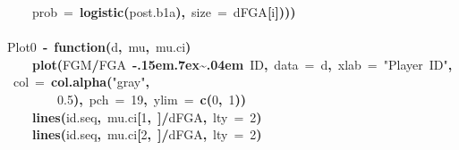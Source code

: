 \documentclass{article}
\makeatletter
\newcommand{\hlnumber}[1]{\textcolor[rgb]{0,0,0}{#1}}%
\newcommand{\hlfunctioncall}[1]{\textcolor[rgb]{.5,0,.33}{\textbf{#1}}}%
\newcommand{\hlstring}[1]{\textcolor[rgb]{.6,.6,1}{#1}}%
\newcommand{\hlkeyword}[1]{\textbf{#1}}%
\newcommand{\hlargument}[1]{\textcolor[rgb]{.69,.25,.02}{#1}}%
\newcommand{\hlformalargs}[1]{\hlargument{#1}}%
\newcommand{\hlassignement}[1]{\textbf{#1}}%
\newcommand{\hlsymbol}[1]{#1}%
\def\urltilda{\kern -.15em\lower .7ex\hbox{\~{}}\kern .04em}%
\newcommand{\hlstd}[1]{\textcolor[rgb]{0,0,0}{#1}}%
\newenvironment{kframe}{%
 \def\FrameCommand##1{\hskip\@totalleftmargin \hskip-\fboxsep
 \colorbox{shadecolor}{##1}\hskip-\fboxsep
     \hskip-\linewidth \hskip-\@totalleftmargin \hskip\columnwidth}%
 \MakeFramed {\advance\hsize-\width
   \@totalleftmargin\z@ \linewidth\hsize
   \@setminipage}}%
 {\par\unskip\endMakeFramed}
\newenvironment{knitrout}{}{} %
\makeatother
\begin{document}
\begin{knitrout}
{\begin{kframe}
\begin{flushleft}
\hlstd{}{\ }{\ }{\ }{\ }\hlargument{prob}{\ }\hlargument{=}{\ }\hlfunctioncall{logistic}\hlkeyword{(}\hlsymbol{post.b1}\hlkeyword{\usebox{\hlnormalsizeboxdollar}}\hlsymbol{a}\hlkeyword{)}\hlkeyword{,}{\ }\hlargument{size}{\ }\hlargument{=}{\ }\hlsymbol{d}\hlkeyword{\usebox{\hlnormalsizeboxdollar}}\hlsymbol{FGA}\hlkeyword{[}\hlsymbol{i}\hlkeyword{]}\hlkeyword{)}\hlkeyword{)}\hlkeyword{)}\hspace*{\fill}\\
\hlstd{}\hspace*{\fill}\\
\hlstd{}\hlsymbol{Plot0}{\ }\hlassignement{\usebox{\hlnormalsizeboxlessthan}-}{\ }\hlkeyword{function}\hlkeyword{(}\hlformalargs{d}\hlkeyword{,}{\ }\hlformalargs{mu}\hlkeyword{,}{\ }\hlformalargs{mu.ci}\hlkeyword{)}{\ }\hlkeyword{\usebox{\hlnormalsizeboxopenbrace}}\hspace*{\fill}\\
\hlstd{}{\ }{\ }{\ }{\ }\hlfunctioncall{plot}\hlkeyword{(}\hlsymbol{FGM}\hlkeyword{/}\hlsymbol{FGA}{\ }\hlkeyword{\urltilda{}}{\ }\hlsymbol{ID}\hlkeyword{,}{\ }\hlargument{data}{\ }\hlargument{=}{\ }\hlsymbol{d}\hlkeyword{,}{\ }\hlargument{xlab}{\ }\hlargument{=}{\ }\hlstring{"Player{\ }ID"}\hlkeyword{,}{\ }\hlargument{col}{\ }\hlargument{=}{\ }\hlfunctioncall{col.alpha}\hlkeyword{(}\hlstring{"gray"}\hlkeyword{,}\hspace*{\fill}\\
\hlstd{}{\ }{\ }{\ }{\ }{\ }{\ }{\ }{\ }\hlnumber{0.5}\hlkeyword{)}\hlkeyword{,}{\ }\hlargument{pch}{\ }\hlargument{=}{\ }\hlnumber{19}\hlkeyword{,}{\ }\hlargument{ylim}{\ }\hlargument{=}{\ }\hlfunctioncall{c}\hlkeyword{(}\hlnumber{0}\hlkeyword{,}{\ }\hlnumber{1}\hlkeyword{)}\hlkeyword{)}\hspace*{\fill}\\
\hlstd{}{\ }{\ }{\ }{\ }\hlfunctioncall{lines}\hlkeyword{(}\hlsymbol{id.seq}\hlkeyword{,}{\ }\hlsymbol{mu.ci}\hlkeyword{[}\hlnumber{1}\hlkeyword{,}{\ }\hlkeyword{]}\hlkeyword{/}\hlsymbol{d}\hlkeyword{\usebox{\hlnormalsizeboxdollar}}\hlsymbol{FGA}\hlkeyword{,}{\ }\hlargument{lty}{\ }\hlargument{=}{\ }\hlnumber{2}\hlkeyword{)}\hspace*{\fill}\\
\hlstd{}{\ }{\ }{\ }{\ }\hlfunctioncall{lines}\hlkeyword{(}\hlsymbol{id.seq}\hlkeyword{,}{\ }\hlsymbol{mu.ci}\hlkeyword{[}\hlnumber{2}\hlkeyword{,}{\ }\hlkeyword{]}\hlkeyword{/}\hlsymbol{d}\hlkeyword{\usebox{\hlnormalsizeboxdollar}}\hlsymbol{FGA}\hlkeyword{,}{\ }\hlargument{lty}{\ }\hlargument{=}{\ }\hlnumber{2}\hlkeyword{)}\hspace*{\fill}\\

\end{flushleft}
\end{kframe}}
\end{knitrout}
\end{document}
